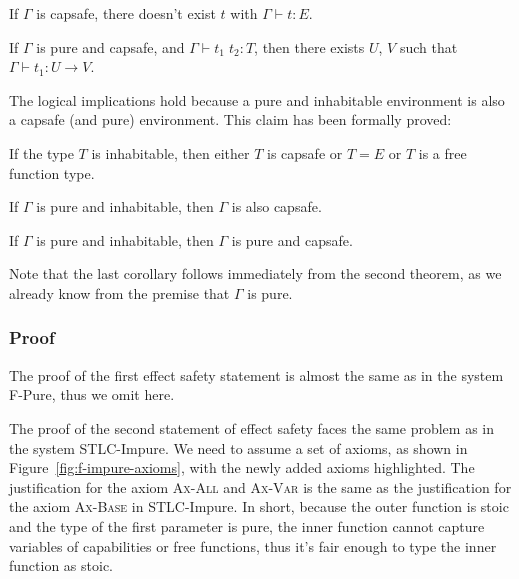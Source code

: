 \begin{definition}
  If $\Gamma$ is capsafe, there doesn't exist $t$ with
  $\Gamma \vdash t : E$.
\end{definition}

\begin{definition}
  If $\Gamma$ is pure and capsafe, and $\Gamma \vdash t_1 \; t_2 : T$,
  then there exists $U$, $V$ such that $\Gamma \vdash t_1 : U \to V$.
\end{definition}

The logical implications hold because a pure and inhabitable
environment is also a capsafe (and pure) environment. This claim has
been formally proved:

\begin{lemma}
  If the type $T$ is inhabitable, then either $T$ is capsafe or
  $T = E$ or $T$ is a free function type.
\end{lemma}

\begin{theorem}
  If $\Gamma$ is pure and inhabitable, then $\Gamma$ is also capsafe.
\end{theorem}

\begin{corollary}
  If $\Gamma$ is pure and inhabitable, then $\Gamma$ is pure and
  capsafe.
\end{corollary}

Note that the last corollary follows immediately from the second
theorem, as we already know from the premise that $\Gamma$ is pure.

\subsubsection{Proof}

The proof of the first effect safety statement is almost the same as
in the system F-Pure, thus we omit here.

The proof of the second statement of effect safety faces the same
problem as in the system STLC-Impure. We need to assume a set of
axioms, as shown in Figure~\ref{fig:f-impure-axioms}, with the newly
added axioms highlighted. The justification for the axiom
\textsc{Ax-All} and \textsc{Ax-Var} is the same as the justification
for the axiom \textsc{Ax-Base} in STLC-Impure. In short, because the
outer function is stoic and the type of the first parameter is pure,
the inner function cannot capture variables of capabilities or free
functions, thus it's fair enough to type the inner function as stoic.

